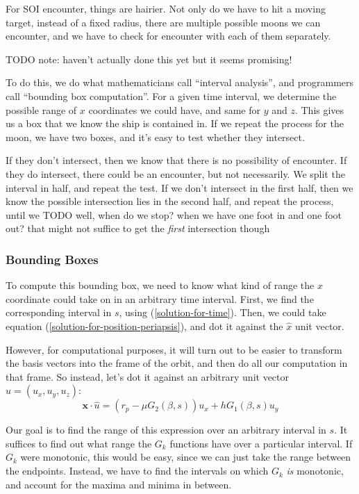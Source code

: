 \documentclass{article}
\numberwithin{equation}{subsection}
\begin{document}
For SOI encounter, things are hairier. Not only do we have to hit a moving target, instead of a fixed radius, there are multiple possible moons we can encounter, and we have to check for encounter with each of them separately.

TODO note: haven't actually done this yet but it seems promising!

To do this, we do what mathematicians call ``interval analysis'', and programmers call ``bounding box computation''. For a given time interval, we determine the possible range of $x$ coordinates we could have, and same for $y$ and $z$. This gives us a box that we know the ship is contained in. If we repeat the process for the moon, we have two boxes, and it's easy to test whether they intersect.

If they don't intersect, then we know that there is no possibility of encounter. If they do intersect, there could be an encounter, but not necessarily. We split the interval in half, and repeat the test. If we don't intersect in the first half, then we know the possible intersection lies in the second half, and repeat the process, until we TODO well, when do we stop? when we have one foot in and one foot out? that might not suffice to get the \textit{first} intersection though

\subsubsection*{Bounding Boxes}

To compute this bounding box, we need to know what kind of range the $x$ coordinate could take on in an arbitrary time interval. First, we find the corresponding interval in $s$, using (\ref{solution-for-time}). Then, we could take equation (\ref{solution-for-position-periapsis}), and dot it against the $\hat x$ unit vector.

However, for computational purposes, it will turn out to be easier to transform the basis vectors into the frame of the orbit, and then do all our computation in that frame. So instead, let's dot it against an arbitrary unit vector $\hat{u} = (u_x, u_y, u_z)$:
\begin{equation}
\bm x \cdot \hat{u} = (r_p - \mu G_2(\beta, s)) u_x + h G_1(\beta, s) u_y
\end{equation}

Our goal is to find the range of this expression over an arbitrary interval in $s$. It suffices to find out what range the $G_k$ functions have over a particular interval. If $G_k$ were monotonic, this would be easy, since we can just take the range between the endpoints. Instead, we have to find the intervals on which $G_k$ \textit{is} monotonic, and account for the maxima and minima in between.
\end{document}
